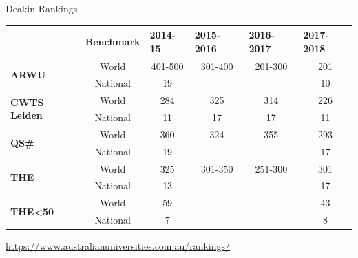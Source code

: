 \documentclass[
 size=14pt,
 paper=smartboard,  %
 mode=present, 		%
 display=slides, 	%
 style=tuliplab,  	%
 pauseslide,
 fleqn,leqno]{powerdot}{}
\begin{document}
\begin{slide}{Deakin Rankings}
\begin{table}[htbp]
  \setlength{\abovecaptionskip}{-2pt}
  \setlength{\belowcaptionskip}{12pt}
  \centering
    \begin{tabular}{l|c|cccc}
    \toprule
      & \textbf{Benchmark} & \multicolumn{1}{l}{\textbf{2014-15}} & \multicolumn{1}{l}{\textbf{2015-2016}} & \multicolumn{1}{l}{\textbf{2016-2017}} & \multicolumn{1}{l}{\textbf{2017-2018}} \\ \midrule
    \multirow{2}[0]{*}{\textbf{ARWU}} & World & 401-500 & 301-400 & 201-300 & 201 \\
      & National  & 19 &   &   & 10 \\
      \midrule
    \multirow{2}[0]{*}{\textbf{CWTS Leiden}} & World  & 284 & 325 & 314 & 226 \\
      & National  & 11 & 17 & 17 & 11 \\
      \midrule
    \multirow{2}[0]{*}{\textbf{QS\#}} & World  & 360 & 324 & 355 & 293 \\
      & National & 19 &   &   & 17 \\
      \midrule
    \multirow{2}[0]{*}{\textbf{THE} } & World  & 325 & 301-350 & 251-300 & 301 \\
      & National  & 13 &   &   & 17 \\
      \midrule
    \multirow{2}[0]{*}{\textbf{THE<50}} & World  & 59 &   &   & 43 \\
      & National  & 7 &   &   & 8 \\
      \bottomrule
    \end{tabular}
  \label{tab:Deakin Ranking}
\end{table}
\centering
\url{https://www.australianuniversities.com.au/rankings/}
\end{slide}
\end{document}
